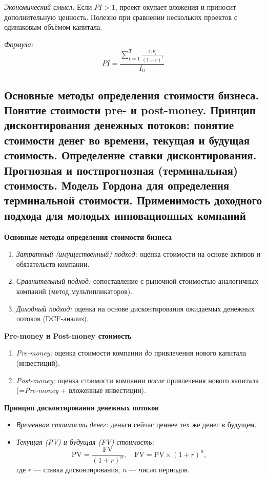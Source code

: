 \textit{Экономический смысл:} Если $PI > 1$, проект окупает вложения и приносит дополнительную ценность. Полезно при сравнении нескольких проектов с одинаковым объёмом капитала.

\textit{Формула:}
\begin{equation}
    PI = \frac{\sum \limits_{t=1} ^T \frac{CF_t}{(1+r)^t}}{I_0}
\end{equation}
\pagebreak


\subsection{Основные методы определения стоимости бизнеса. Понятие стоимости pre- и post-money. Принцип дисконтирования денежных потоков: понятие стоимости денег во времени, текущая и будущая стоимость. Определение ставки дисконтирования. Прогнозная и постпрогнозная (терминальная) стоимость. Модель Гордона для определения терминальной стоимости. Применимость доходного подхода для молодых инновационных компаний}

\textbf{Основные методы определения стоимости бизнеса}
\begin{enumerate}
    \item \textit{Затратный (имущественный) подход:} оценка стоимости на основе активов и обязательств компании.
    \item \textit{Сравнительный подход:} сопоставление с рыночной стоимостью аналогичных компаний (метод мультипликаторов).
    \item \textit{Доходный подход:} оценка на основе дисконтирования ожидаемых денежных потоков (DCF-анализ).
\end{enumerate}

\textbf{Pre-money и Post-money стоимость}
\begin{enumerate}
    \item \textit{Pre-money:} оценка стоимости компании \textit{до} привлечения нового капитала (инвестиций).
    \item \textit{Post-money:} оценка стоимости компании \textit{после} привлечения нового капитала (=\textit{Pre-money} + вложенные инвестиции).
\end{enumerate}

\textbf{Принцип дисконтирования денежных потоков}
\begin{itemize}
    \item \textit{Временная стоимость денег:} деньги сейчас ценнее тех же денег в будущем.
    \item \textit{Текущая (PV) и будущая (FV) стоимость:}
    \[
      \text{PV} = \frac{\text{FV}}{(1 + r)^n},
      \quad
      \text{FV} = \text{PV} \times (1 + r)^n,
    \]
    где $r$ --- ставка дисконтирования, $n$ --- число периодов.
\end{itemize}

